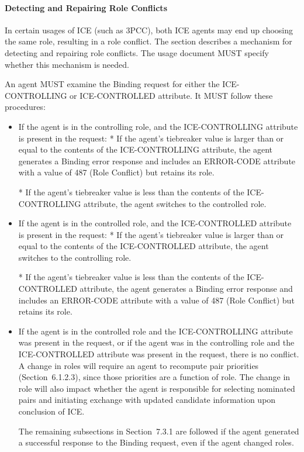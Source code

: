 \documentclass{article}
\begin{document}
\paragraph{Detecting and Repairing Role Conflicts}

In certain usages of ICE (such as 3PCC), both ICE agents may end up choosing the same role, resulting in a role conflict.  The section describes a mechanism for detecting and repairing role conflicts. The usage document MUST specify whether this mechanism is needed.

An agent MUST examine the Binding request for either the ICE- CONTROLLING or ICE-CONTROLLED attribute.  It MUST follow these procedures:

\begin{itemize}
\item If the agent is in the controlling role, and the ICE-CONTROLLING attribute is present in the request:
*  If the agent's tiebreaker value is larger than or equal to the contents of the ICE-CONTROLLING attribute, the agent generates a Binding error response and includes an ERROR-CODE attribute with a value of 487 (Role Conflict) but retains its role.

*  If the agent's tiebreaker value is less than the contents of the ICE-CONTROLLING attribute, the agent switches to the controlled role.

\item If the agent is in the controlled role, and the ICE-CONTROLLED attribute is present in the request:
*  If the agent's tiebreaker value is larger than or equal to the contents of the ICE-CONTROLLED attribute, the agent switches to the controlling role.

*  If the agent's tiebreaker value is less than the contents of the ICE-CONTROLLED attribute, the agent generates a Binding error response and includes an ERROR-CODE attribute with a value of 487 (Role Conflict) but retains its role.

\item If the agent is in the controlled role and the ICE-CONTROLLING attribute was present in the request, or if the agent was in the controlling role and the ICE-CONTROLLED attribute was present in the request, there is no conflict.
A change in roles will require an agent to recompute pair priorities (Section~6.1.2.3), since those priorities are a function of role. The change in role will also impact whether the agent is responsible for selecting nominated pairs and initiating exchange with updated candidate information upon conclusion of ICE.

The remaining subsections in Section~7.3.1 are followed if the agent generated a successful response to the Binding request, even if the agent changed roles.

\end{itemize}
\end{document}

